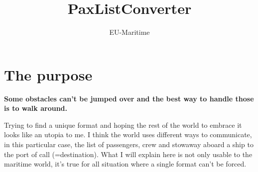 \documentclass[a4paper, 11pt]{article}
\newcommand{\head}[1]{\textnormal{\textbf{#1}}}
\begin{document}
\title{PaxListConverter}
\author{EU-Maritime}
\maketitle



\section{The purpose}
\head{
Some obstacles can't be jumped over and the best way to handle those is to walk around.
}

Trying to find a unique format and hoping the rest of the world to embrace it looks like an utopia to me. I think the world uses different ways to communicate, in this particular case, the list of passengers, crew and stowaway aboard a ship to the port of call (=destination). What I will explain here is not only usable to the maritime world, it's true for all situation where a single format can't be forced.
\end{document}
